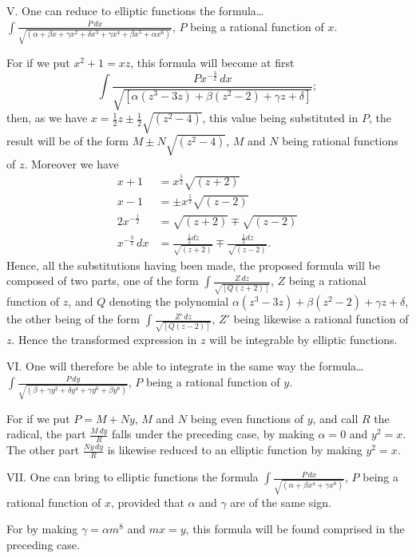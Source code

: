\documentclass{article}
\begin{document}
V. One can reduce to elliptic functions the formula\ldots\ $\displaystyle\int\frac{P\,dx}{\sqrt{(\alpha+\beta x+\gamma x^{2}+\delta x^{3}+\gamma x^{4}+\beta x^{5}+\alpha x^{6})}}$, $P$ being a rational function of $x$.


For if we put $x^{2}+1=xz$, this formula will become at first
\[ \int\frac{Px^{-\frac{3}{2}}\,dx}{\sqrt{[\alpha(z^{3}-3z)+\beta(z^{2}-2)+\gamma z+\delta]}}; \]
then, as we have $x=\frac{1}{2}z\pm\frac{1}{2}\sqrt{(z^{2}-4)}$, this value being substituted in $P$, the result will be of the form $M\pm N\sqrt{(z^{2}-4)}$, $M$ and $N$ being rational functions of $z$. Moreover we have
\[ \begin{aligned} x+1&=x^{\frac{1}{2}}\sqrt{(z+2)}\\ x-1&=\pm x^{\frac{1}{2}}\sqrt{(z-2)}\\ 2x^{-\frac{1}{2}}&=\sqrt{(z+2)}\mp\sqrt{(z-2)}\\ x^{-\frac{3}{2}}\,dx&=\frac{\tfrac{1}{2}dz}{\sqrt{(z+2)}}\mp\frac{\tfrac{1}{2}dz}{\sqrt{(z-2)}}. \end{aligned} \]
Hence, all the substitutions having been made, the proposed formula will be composed of two parts, one of the form $\displaystyle\int\frac{Z\,dz}{\sqrt{[Q(z+2)]}}$, $Z$ being a rational function of $z$, and $Q$ denoting the polynomial $\alpha(z^{3}-3z)+\beta(z^{2}-2)+\gamma z+\delta$, the other being of the form $\displaystyle\int\frac{Z'\,dz}{\sqrt{[Q(z-2)]}}$, $Z'$ being likewise a rational function of $z$. Hence the transformed expression in $z$ will be integrable by elliptic functions.

VI. One will therefore be able to integrate in the same way the formula\ldots\ $\displaystyle\int\frac{P\,dy}{\sqrt{(\beta+\gamma y^{2}+\delta y^{4}+\gamma y^{6}+\beta y^{8})}}$, $P$ being a rational function of $y$.

For if we put $P=M+Ny$, $M$ and $N$ being even functions of $y$, and call $R$ the radical, the part $\frac{M\,dy}{R}$ falls under the preceding case, by making $\alpha=0$ and $y^{2}=x$. The other part $\frac{Ny\,dy}{R}$ is likewise reduced to an elliptic function by making $y^{2}=x$.

VII. One can bring to elliptic functions the formula $\displaystyle\int\frac{P\,dx}{\sqrt{(\alpha+\beta x^{4}+\gamma x^{8})}}$, $P$ being a rational function of $x$, provided that $\alpha$ and $\gamma$ are of the same sign.

For by making $\gamma=\alpha m^{8}$ and $mx=y$, this formula will be found comprised in the preceding case.
\end{document}
